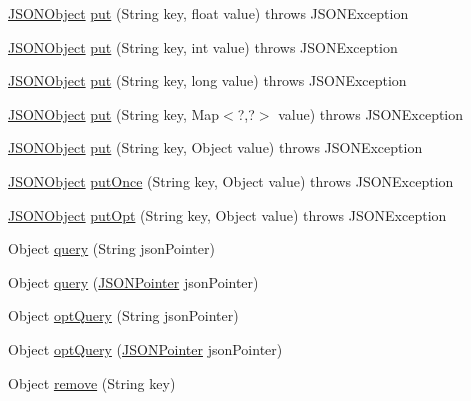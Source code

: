 \begin{DoxyCompactItemize}
\item 
\hyperlink{classorg_1_1json_1_1JSONObject}{J\-S\-O\-N\-Object} \hyperlink{classorg_1_1json_1_1JSONObject_a420cbb510cef3161d54f59801279cda0}{put} (String key, float value)  throws J\-S\-O\-N\-Exception 
\item 
\hyperlink{classorg_1_1json_1_1JSONObject}{J\-S\-O\-N\-Object} \hyperlink{classorg_1_1json_1_1JSONObject_a36a08204331752dffedc6e9d1b6aa297}{put} (String key, int value)  throws J\-S\-O\-N\-Exception 
\item 
\hyperlink{classorg_1_1json_1_1JSONObject}{J\-S\-O\-N\-Object} \hyperlink{classorg_1_1json_1_1JSONObject_a5807cd038e9ae979a692db1b99461205}{put} (String key, long value)  throws J\-S\-O\-N\-Exception 
\item 
\hyperlink{classorg_1_1json_1_1JSONObject}{J\-S\-O\-N\-Object} \hyperlink{classorg_1_1json_1_1JSONObject_ae2efab9c8dd3029750be85e6fd43dddc}{put} (String key, Map$<$?,?$>$ value)  throws J\-S\-O\-N\-Exception 
\item 
\hyperlink{classorg_1_1json_1_1JSONObject}{J\-S\-O\-N\-Object} \hyperlink{classorg_1_1json_1_1JSONObject_a2af440c4653ad8a23b0ac5ded37cd4d5}{put} (String key, Object value)  throws J\-S\-O\-N\-Exception 
\item 
\hyperlink{classorg_1_1json_1_1JSONObject}{J\-S\-O\-N\-Object} \hyperlink{classorg_1_1json_1_1JSONObject_ac6cc7fe095a7711be90f2e02163ef49e}{put\-Once} (String key, Object value)  throws J\-S\-O\-N\-Exception 
\item 
\hyperlink{classorg_1_1json_1_1JSONObject}{J\-S\-O\-N\-Object} \hyperlink{classorg_1_1json_1_1JSONObject_a023672439a8c851a663a183120fc126e}{put\-Opt} (String key, Object value)  throws J\-S\-O\-N\-Exception 
\item 
Object \hyperlink{classorg_1_1json_1_1JSONObject_ae78919e793b1e545f6b146d1d526dae1}{query} (String json\-Pointer)
\item 
Object \hyperlink{classorg_1_1json_1_1JSONObject_a48e5986121273fefaba4cd85fa8ed521}{query} (\hyperlink{classorg_1_1json_1_1JSONPointer}{J\-S\-O\-N\-Pointer} json\-Pointer)
\item 
Object \hyperlink{classorg_1_1json_1_1JSONObject_a62ad8bc6bf63791326ab16339359e71c}{opt\-Query} (String json\-Pointer)
\item 
Object \hyperlink{classorg_1_1json_1_1JSONObject_a33a5e800ffb58b0de4336f0aad9bc703}{opt\-Query} (\hyperlink{classorg_1_1json_1_1JSONPointer}{J\-S\-O\-N\-Pointer} json\-Pointer)
\item 
Object \hyperlink{classorg_1_1json_1_1JSONObject_af4faca830e4bb6a00bccad695bd58c4d}{remove} (String key)

\end{DoxyCompactItemize}

